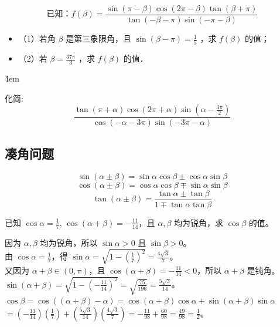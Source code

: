 \begin{problem}
$$\text{已知：}f(\beta)=\frac{\sin (\pi-\beta) \cos (2 \pi-\beta) \tan (\beta+\pi)}{\tan (-\beta-\pi) \sin (-\pi-\beta)}$$
\begin{itemize}
    \item （1）若角 $\beta$ 是第三象限角，且 $\sin (\beta-\pi)=\frac{1}{5}$ ，求 $f(\beta)$ 的值；
    \item （2）若 $\beta=\frac{37 \pi}{3}$ ，求 $f(\beta)$ 的值．
\end{itemize}
\end{problem}

\v{4em}

\begin{problem}
化简:
$$
    \frac{\tan (\pi+\alpha) \cos (2 \pi+\alpha) \sin \left(\alpha-\frac{3 \pi}{2}\right)}{\cos (-\alpha-3 \pi) \sin (-3 \pi-\alpha)}
$$
\end{problem}


\subsection{凑角问题}

\begin{theorem}[两角和与差的三角函数]
    $$ \sin(\alpha \pm \beta) = \sin\alpha\cos\beta \pm \cos\alpha\sin\beta $$
    $$ \cos(\alpha \pm \beta) = \cos\alpha\cos\beta \mp \sin\alpha\sin\beta $$
    $$ \tan(\alpha \pm \beta) = \frac{\tan\alpha \pm \tan\beta}{1 \mp \tan\alpha\tan\beta} $$
\end{theorem}

\begin{example}
    已知 $\cos\alpha = \frac{1}{7}$, $\cos(\alpha+\beta)=-\frac{11}{14}$，且 $\alpha, \beta$ 均为锐角，求 $\cos\beta$ 的值。
\end{example}
\begin{solution}
    因为 $\alpha, \beta$ 均为锐角，所以 $\sin\alpha > 0$ 且 $\sin\beta > 0$。\\
    由 $\cos\alpha = \frac{1}{7}$，得 $\sin\alpha = \sqrt{1 - (\frac{1}{7})^2} = \frac{4\sqrt{3}}{7}$。\\
    又因为 $\alpha+\beta \in (0, \pi)$，且 $\cos(\alpha+\beta)=-\frac{11}{14} < 0$，所以 $\alpha+\beta$ 是钝角。\\
    $\sin(\alpha+\beta) = \sqrt{1 - (-\frac{11}{14})^2} = \sqrt{\frac{75}{196}} = \frac{5\sqrt{3}}{14}$。\\
    $\cos\beta = \cos((\alpha+\beta)-\alpha) = \cos(\alpha+\beta)\cos\alpha + \sin(\alpha+\beta)\sin\alpha$
    $= (-\frac{11}{14})(\frac{1}{7}) + (\frac{5\sqrt{3}}{14})(\frac{4\sqrt{3}}{7}) = -\frac{11}{98} + \frac{60}{98} = \frac{49}{98} = \frac{1}{2}$。
\end{solution}
\vspace{2em}



